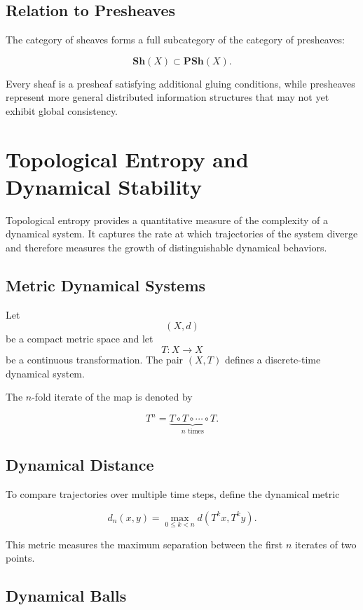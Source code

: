 \documentclass[12pt]{article}
\begin{document}
\subsection{Relation to Presheaves}

The category of sheaves forms a full subcategory of the category of presheaves:

\[
\mathbf{Sh}(X) \subset \mathbf{PSh}(X).
\]

Every sheaf is a presheaf satisfying additional gluing conditions, while presheaves represent more general distributed information structures that may not yet exhibit global consistency.

\section{Topological Entropy and Dynamical Stability}

Topological entropy provides a quantitative measure of the complexity of a dynamical system. It captures the rate at which trajectories of the system diverge and therefore measures the growth of distinguishable dynamical behaviors.

\subsection{Metric Dynamical Systems}

Let
\[
(X,d)
\]
be a compact metric space and let
\[
T : X \rightarrow X
\]
be a continuous transformation. The pair $(X,T)$ defines a discrete-time dynamical system.

The $n$-fold iterate of the map is denoted by

\[
T^n = \underbrace{T \circ T \circ \cdots \circ T}_{n \text{ times}}.
\]

\subsection{Dynamical Distance}

To compare trajectories over multiple time steps, define the dynamical metric

\[
d_n(x,y) = \max_{0 \le k < n} d(T^k x, T^k y).
\]

This metric measures the maximum separation between the first $n$ iterates of two points.

\subsection{Dynamical Balls}
\end{document}
